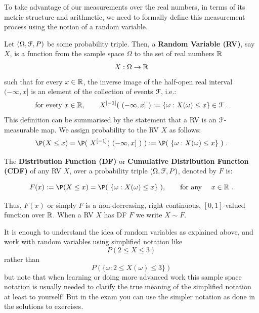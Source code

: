 To take advantage of our measurements over the real numbers, in terms of its  metric structure and arithmetic, we need to formally define this measurement process using the notion of a random variable.
\begin{definition}\label{D:RV}
Let $(\Omega, \mathcal{F},P)$ be some probability triple.  Then, a {\bf Random Variable (RV)}, say $X$, is a function from the sample space $\Omega$ to the set of real numbers $\mathbb{R}$ 
\[
X : \Omega \rightarrow \mathbb{R}
\]
such that for every $x \in \mathbb{R}$, the inverse image of the half-open real interval $(-\infty,x]$ is an element of the collection of events $\mathcal{F}$, i.e.:
\[
\text{for every $x$} \in \Rz, \qquad X^{[-1]}(\ (-\infty,x] \ ) := \{\omega: X(\omega) \leq x\} \in \C{F} \ .
\]
{\scriptsize This definition can be summarised by the statement that a RV is an  $\mathcal{F}$-measurable map.}
We assign probability to the RV $X$ as follows:
\begin{equation}\label{E:ProbOfRV}
\P(X \leq x)  = \P(\ X^{[-1]}(\ (-\infty,x] \ ) \ ) := \P( \ \{\omega: X(\omega) \leq x\} \ ) \ .
\end{equation}
\end{definition}

\begin{definition}\label{D:DF}
The {\bf Distribution Function (DF)} or {\bf Cumulative Distribution Function (CDF)} of any RV $X$, over a  probability triple $(\Omega, \mathcal{F},P)$, denoted by $F$ is:
\begin{framed}
\begin{equation}\label{E:DF}
F(x) := \P(X \leq x) = \P( \ \{\omega: X(\omega) \leq x\} \ ), \qquad \text{for any }\quad x \in \Rz \ .
\end{equation}
\end{framed}
Thus, $F(x)$ or simply $F$ is a non-decreasing, right continuous, $[0,1]$-valued function over $\mathbb{R}$.  When a RV $X$ has DF $F$ we write $X \sim F$.
\end{definition}

\begin{rem}[Notation] 
It is enough to understand the idea of random variables as explained above, and work with 
random variables using simplified notation  like \[P(2\leq X\leq 3)\] rather than \[P(\{\omega: 2\leq  X(\omega) \leq 3\})\]
but note that when learning or doing more advanced work this sample space notation is usually needed to clarify the true meaning of the simplified notation at least to yourself! But in the exam you can use the simpler notation as done in the solutions to exercises.
\end{rem}

